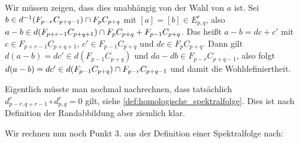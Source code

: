 Wir müssen zeigen, dass dies unabhängig von der Wahl von $a$ ist.
Sei $b \in d^{-1} \enbrace*{F_{p-r}C_{p+q-1}} \cap F_p C_{p+q}$ mit $[a]=[b] \in E^r_{p,q}$, also $a-b \in d \enbrace*{F_{p+r-1} C_{p+q+1}} \cap F_p C_{p+q} + F_{p-1} C_{p+q}$.
Das heißt $a-b = dc + c'$ mit $c \in F_{p+r-1} C_{p+q+1}$, $c' \in F_{p-1} C_{p+q}$ und $d c \in F_p C_{p+q}$.
Dann gilt $d(a-b) = d c' \in d(F_{p-1} C_{p+q})$ und $da -db \in F_{p-r} C_{p+q-1}$, also folgt $d(a-b) = dc' \in d \enbrace*{F_{p-1} C_{p+q}} \cap F_{p-r} C_{p+q-1}$ und damit die Wohldefiniertheit.

Eigentlich müsste man nochmal nachrechnen, dass tatsächlich $d^r_{p-r,q+r-1} \circ d^r_{p,q}=0$ gilt, siehe \autoref{def:homologische_spektralfolge}.
Dies ist nach Definition der Randabbildung aber ziemlich klar.

Wir rechnen nun noch Punkt 3. aus der Definition einer Spektralfolge nach:

